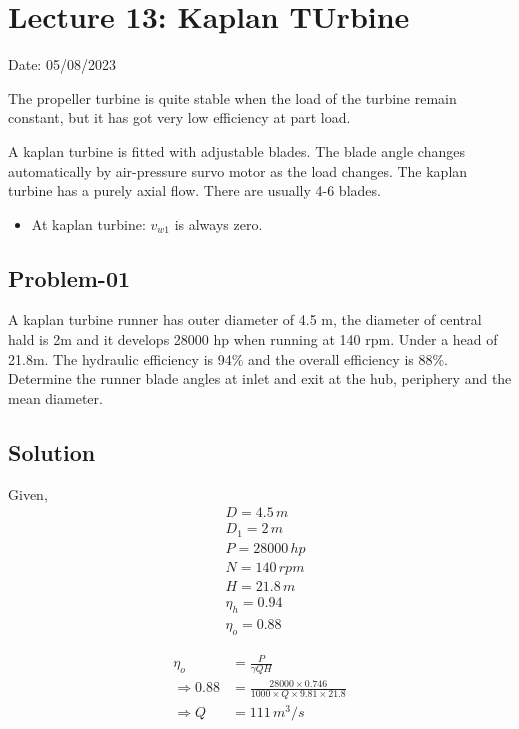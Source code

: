 \documentclass{article}
\begin{document}
\section{Lecture 13: Kaplan TUrbine}
\hfill Date: 05/08/2023

\begin{multicols}{2}
  The propeller turbine is quite stable when the load of the turbine remain constant, but it has got very low efficiency at part load.

  A kaplan turbine is fitted with adjustable blades. The blade angle changes automatically by air-pressure survo motor as the load changes. The kaplan turbine has a purely axial flow. There are usually 4-6 blades. 
  \begin{itemize}
    \item At kaplan turbine: $v_{w1}$ is always zero.
  \end{itemize} 

  \subsection*{Problem-01}
  A kaplan turbine runner has outer diameter of 4.5 m, the diameter of central hald is 2m and it develops 28000 hp when running at 140 rpm. Under a head of 21.8m. The hydraulic efficiency is 94\% and the overall efficiency is 88\%. Determine the runner blade angles at inlet and exit at the hub, periphery and the mean diameter.
  
  \subsection*{Solution}
  Given,
  \begin{align*}
    & D = 4.5 \, m \\
    & D_1 = 2 \, m \\
    & P = 28000 \, hp \\
    & N = 140 \, rpm \\
    & H = 21.8 \, m \\
    & \eta_h = 0.94 \\
    & \eta_o = 0.88
  \end{align*}

  \begin{align*}
    \eta_o &= \frac{P}{\gamma Q H} \\
    \Rightarrow 0.88 &= \frac{28000 \times 0.746}{1000 \times Q \times 9.81 \times 21.8} \\
    \Rightarrow Q &= 111 \, m^3/s
  \end{align*}


\end{multicols}
\end{document}
